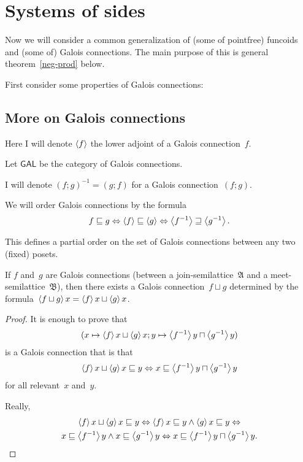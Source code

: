 \chapter{Systems of sides}

Now we will consider a common generalization of (some of pointfree) funcoids and (some of) Galois connections.
The main purpose of this is general theorem~\ref{neg-prod} below.

First consider some properties of Galois connections:

\section{More on Galois connections}

Here I will denote $\left\langle f\right\rangle$ the lower adjoint of a Galois connection~$f$. 

Let $\mathsf{GAL}$ be the category of Galois connections.

I will denote $(f;g)^{-1}=(g;f)$ for a Galois connection~$(f;g)$.

We will order Galois connections by the formula
\[ f\sqsubseteq g \Leftrightarrow \left\langle f\right\rangle\sqsubseteq\left\langle g\right\rangle \Leftrightarrow \left\langle f^{-1}\right\rangle\sqsupseteq\left\langle g^{-1}\right\rangle. \]

\begin{obvious}
This defines a partial order on the set of Galois connections between any two (fixed) posets.
\end{obvious}

\begin{prop}
If $f$ and~$g$ are Galois connections (between a join-semilattice~$\mathfrak{A}$ and a meet-semilattice~$\mathfrak{B}$),
then there exists a Galois connection~$f\sqcup g$
determined by the formula~$\left\langle f\sqcup g\right\rangle x = \left\langle f\right\rangle x\sqcup\left\langle g\right\rangle x$.
\end{prop}

\begin{proof}
It is enough to prove that
\[ (x\mapsto\left\langle f\right\rangle x\sqcup\left\langle g\right\rangle x; y\mapsto\left\langle f^{-1}\right\rangle y\sqcap\left\langle g^{-1}\right\rangle y) \]
is a Galois connection that is that
\[ \left\langle f\right\rangle x\sqcup\left\langle g\right\rangle x\sqsubseteq y\Leftrightarrow x\sqsubseteq\left\langle f^{-1}\right\rangle y\sqcap\left\langle g^{-1}\right\rangle y \] for all relevant~$x$ and~$y$.

Really,
\begin{multline*}
\left\langle f\right\rangle x\sqcup\left\langle g\right\rangle x\sqsubseteq y \Leftrightarrow
\left\langle f\right\rangle x\sqsubseteq y\land\left\langle g\right\rangle x\sqsubseteq y \Leftrightarrow \\
x\sqsubseteq\left\langle f^{-1}\right\rangle y\land x\sqsubseteq\left\langle g^{-1}\right\rangle y \Leftrightarrow
x\sqsubseteq\left\langle f^{-1}\right\rangle y\sqcap\left\langle g^{-1}\right\rangle y.
\end{multline*}
\end{proof}

